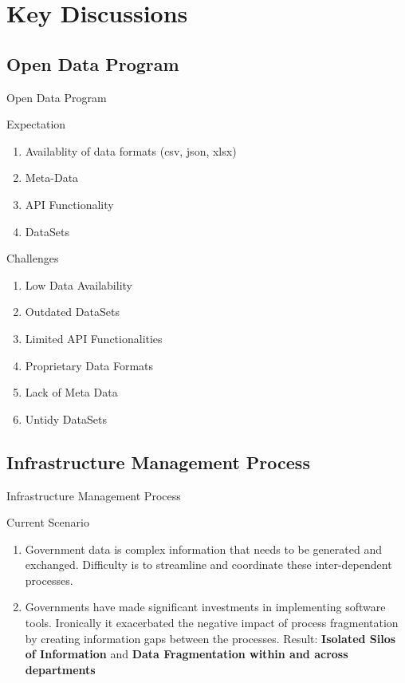 
\section{Key Discussions}
\subsection{Open Data Program}
\begin{frame}{Open Data Program}
    \begin{alertblock}{Expectation}
        \begin{enumerate}
            \item Availablity of data formats (csv, json, xlsx)
            \item Meta-Data
            \item API Functionality
            \item DataSets
        \end{enumerate}
    \end{alertblock}
    \begin{block}{Challenges}
        \begin{enumerate}
            \item Low Data Availability
            \item Outdated DataSets
            \item Limited API Functionalities
            \item Proprietary Data Formats
            \item Lack of Meta Data
            \item Untidy DataSets
        \end{enumerate}
    \end{block}
\end{frame}

\subsection{Infrastructure Management Process}
\begin{frame}{Infrastructure Management Process}
\begin{alertblock}{Current Scenario}
    \begin{enumerate}
        \item Government data is complex information that needs to be generated and exchanged. Difficulty is to streamline and coordinate these inter-dependent processes.
        \item Governments have made significant investments in implementing software tools. Ironically it exacerbated the negative impact of process fragmentation by creating information gaps between the processes. Result: \textbf{Isolated Silos of Information} and \textbf{Data Fragmentation within and across departments} 
    \end{enumerate}
\end{alertblock}    
\end{frame}

